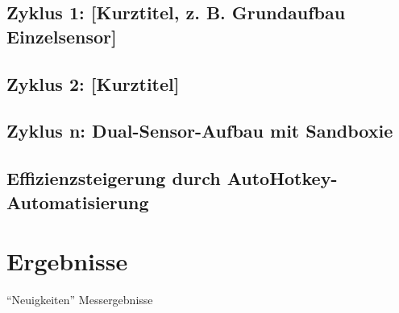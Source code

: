 
\section{Zyklus 1: [Kurztitel, z. B. Grundaufbau Einzelsensor]}
\label{sec:realisierung-zyklus1}

\section{Zyklus 2: [Kurztitel]}
\label{sec:realisierung-zyklus2}

\section{Zyklus n: Dual-Sensor-Aufbau mit Sandboxie}
\label{sec:realisierung-dualsensor}

\section{Effizienzsteigerung durch AutoHotkey-Automatisierung}
\label{sec:realisierung-autohotkey}

\chapter{Ergebnisse}
\label{sec:ergebnisse}
\enquote{Neuigkeiten} Messergebnisse

